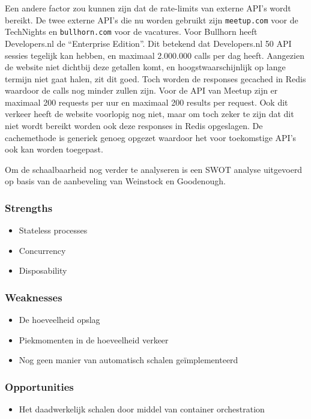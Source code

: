 Een andere factor zou kunnen zijn dat de rate-limits van externe API's wordt bereikt. De twee externe API's die nu worden gebruikt zijn \texttt{meetup.com} voor de TechNights en \texttt{bullhorn.com} voor de vacatures. Voor Bullhorn heeft Developers.nl de \enquote{Enterprise Edition}. Dit betekend dat Developers.nl 50 API sessies tegelijk kan hebben, en maximaal 2.000.000 calls per dag heeft. Aangezien de website niet dichtbij deze getallen komt, en hoogstwaarschijnlijk op lange termijn niet gaat halen, zit dit goed. Toch worden de responses gecached in Redis waardoor de calls nog minder zullen zijn. Voor de API van Meetup zijn er maximaal 200 requests per uur en maximaal 200 results per request. Ook dit verkeer heeft de website voorlopig nog niet, maar om toch zeker te zijn dat dit niet wordt bereikt worden ook deze responses in Redis opgeslagen. De cachemethode is generiek genoeg opgezet waardoor het voor toekomstige API's ook kan worden toegepast.

Om de schaalbaarheid nog verder te analyseren is een SWOT analyse uitgevoerd op basis van de aanbeveling van Weinstock en Goodenough.

\subsubsection{Strengths}
\begin{itemize}
	\item Stateless processes
	\item Concurrency
	\item Disposability
\end{itemize}

\subsubsection{Weaknesses}
\begin{itemize}
	\item De hoeveelheid opslag
	\item Piekmomenten in de hoeveelheid verkeer
	\item Nog geen manier van automatisch schalen geïmplementeerd
\end{itemize}

\subsubsection{Opportunities}
\begin{itemize}
	\item Het daadwerkelijk schalen door middel van container orchestration
\end{itemize}

